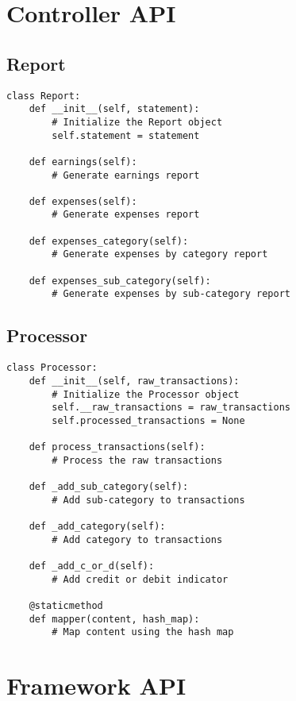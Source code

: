 \documentclass[11pt,a4paper]{report}
\begin{document}
\section{Controller API}

\subsection{Report}
\begin{lstlisting}
class Report:
    def __init__(self, statement):
        # Initialize the Report object
        self.statement = statement
        
    def earnings(self):
        # Generate earnings report
        
    def expenses(self):
        # Generate expenses report
        
    def expenses_category(self):
        # Generate expenses by category report
        
    def expenses_sub_category(self):
        # Generate expenses by sub-category report
\end{lstlisting}

\subsection{Processor}
\begin{lstlisting}
class Processor:
    def __init__(self, raw_transactions):
        # Initialize the Processor object
        self.__raw_transactions = raw_transactions
        self.processed_transactions = None
        
    def process_transactions(self):
        # Process the raw transactions
        
    def _add_sub_category(self):
        # Add sub-category to transactions
        
    def _add_category(self):
        # Add category to transactions
        
    def _add_c_or_d(self):
        # Add credit or debit indicator
        
    @staticmethod
    def mapper(content, hash_map):
        # Map content using the hash map
\end{lstlisting}

\section{Framework API}
\end{document}
